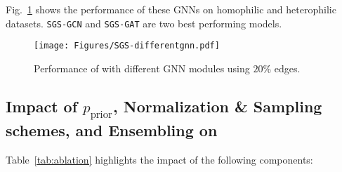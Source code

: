 Fig.~\ref{fig:sparsityvsgnn} shows the performance of these GNNs on homophilic and heterophilic datasets. \texttt{SGS-GCN} and \texttt{SGS-GAT} are two best performing models.


\begin{figure}[!htbp]
\centering
\texttt{[image: Figures/SGS-differentgnn.pdf]}

\caption{Performance of \sgs with different GNN modules using $20\%$ edges.}
\label{fig:sparsityvsgnn}
\end{figure}



\subsection{Impact of  $p_\mathrm{prior}$, Normalization \& Sampling schemes, and Ensembling on \sgs}
\label{app:parameters}

Table~\ref{tab:ablation} highlights the impact of the following components: 



